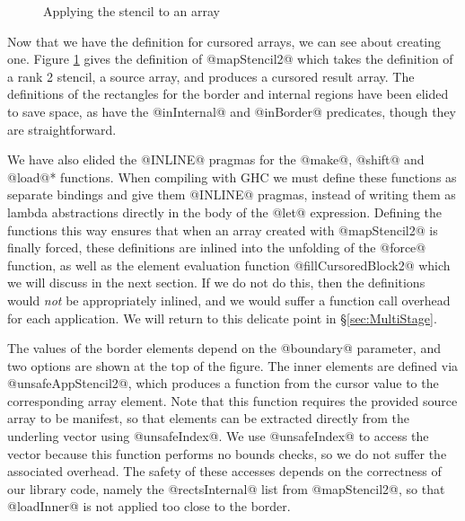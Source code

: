 \begin{figure}
\begin{small}
\end{small}
\caption{Applying the stencil to an array}
\label{fig:MapStencil}
\end{figure}

Now that we have the definition for cursored arrays, we can see about creating one. Figure \ref{fig:MapStencil} gives the definition of @mapStencil2@ which takes the definition of a rank 2 stencil, a source array, and produces a cursored result array. The definitions of the rectangles for the border and internal regions have been elided to save space, as have the @inInternal@ and @inBorder@ predicates, though they are straightforward.

We have also elided the @INLINE@ pragmas for the @make@, @shift@ and @load@* functions. When compiling with GHC we must define these functions as separate bindings and give them @INLINE@ pragmas, instead of writing them as lambda abstractions directly in the body of the @let@ expression. Defining the functions this way ensures that when an array created with @mapStencil2@ is finally forced, these definitions are inlined into the unfolding of the @force@ function, as well as the element evaluation function @fillCursoredBlock2@ which we will discuss in the next section. If we do not do this, then the definitions would \emph{not} be appropriately inlined, and we would suffer a function call overhead for each application. We will return to this delicate point in \S\ref{sec:MultiStage}.

The values of the border elements depend on the @boundary@ parameter, and two options are shown at the top of the figure. The inner elements are defined via @unsafeAppStencil2@, which produces a function from the cursor value to the corresponding array element. Note that this function requires the provided source array to be manifest, so that elements can be extracted directly from the underling vector using @unsafeIndex@. We use @unsafeIndex@ to access the vector because this function performs no bounds checks, so we do not suffer the associated overhead. The safety of these accesses depends on the correctness of our library code, namely the @rectsInternal@ list from @mapStencil2@, so that @loadInner@ is not applied too close to the border.

